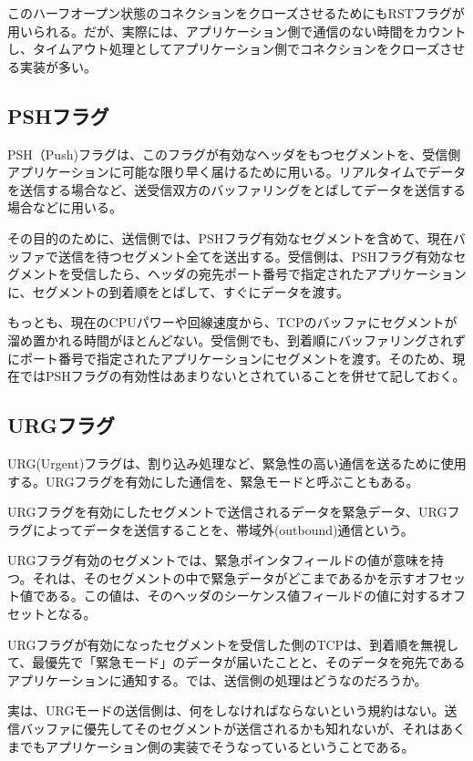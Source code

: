 このハーフオープン状態のコネクションをクローズさせるためにもRSTフラグが用いられる。だが、実際には、アプリケーション側で通信のない時間をカウントし、タイムアウト処理としてアプリケーション側でコネクションをクローズさせる実装が多い。


\subsection{PSHフラグ}
PSH（Push)フラグは、このフラグが有効なヘッダをもつセグメントを、受信側アプリケーションに可能な限り早く届けるために用いる。リアルタイムでデータを送信する場合など、送受信双方のバッファリングをとばしてデータを送信する場合などに用いる。

その目的のために、送信側では、PSHフラグ有効なセグメントを含めて、現在バッファで送信を待つセグメント全てを送出する。受信側は、PSHフラグ有効なセグメントを受信したら、ヘッダの宛先ポート番号で指定されたアプリケーションに、セグメントの到着順をとばして、すぐにデータを渡す。

もっとも、現在のCPUパワーや回線速度から、TCPのバッファにセグメントが溜め置かれる時間がほとんどない。受信側でも、到着順にバッファリングされずにポート番号で指定されたアプリケーションにセグメントを渡す。そのため、現在ではPSHフラグの有効性はあまりないとされていることを併せて記しておく。

\subsection{URGフラグ}
URG(Urgent)フラグは、割り込み処理など、緊急性の高い通信を送るために使用する。URGフラグを有効にした通信を、緊急モードと呼ぶこともある。

URGフラグを有効にしたセグメントで送信されるデータを緊急データ、URGフラグによってデータを送信することを、帯域外(outbound)通信という。

URGフラグ有効のセグメントでは、緊急ポインタフィールドの値が意味を持つ。それは、そのセグメントの中で緊急データがどこまであるかを示すオフセット値である。この値は、そのヘッダのシーケンス値フィールドの値に対するオフセットとなる。

URGフラグが有効になったセグメントを受信した側のTCPは、到着順を無視して、最優先で「緊急モード」のデータが届いたことと、そのデータを宛先であるアプリケーションに通知する。では、送信側の処理はどうなのだろうか。

実は、URGモードの送信側は、何をしなければならないという規約はない。送信バッファに優先してそのセグメントが送信されるかも知れないが、それはあくまでもアプリケーション側の実装でそうなっているということである。

